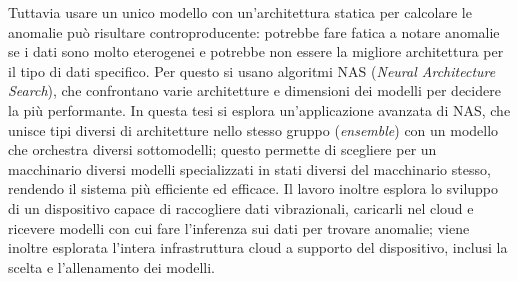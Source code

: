 Tuttavia usare un unico modello con un'architettura statica per calcolare le anomalie può risultare controproducente: potrebbe fare fatica a notare anomalie se i dati sono molto eterogenei e potrebbe non essere la migliore architettura per il tipo di dati specifico. Per questo si usano algoritmi NAS (\textit{Neural Architecture Search}), che confrontano varie architetture e dimensioni dei modelli per decidere la più performante. In questa tesi si esplora un'applicazione avanzata di NAS, che unisce tipi diversi di architetture nello stesso gruppo (\textit{ensemble}) con un modello che orchestra diversi sottomodelli; questo permette di scegliere per un macchinario diversi modelli specializzati in stati diversi del macchinario stesso, rendendo il sistema più efficiente ed efficace.
Il lavoro inoltre esplora lo sviluppo di un dispositivo capace di raccogliere dati vibrazionali, caricarli nel cloud e ricevere modelli con cui fare l'inferenza sui dati per trovare anomalie; viene inoltre esplorata l'intera infrastruttura cloud a supporto del dispositivo, inclusi la scelta e l'allenamento dei modelli.
